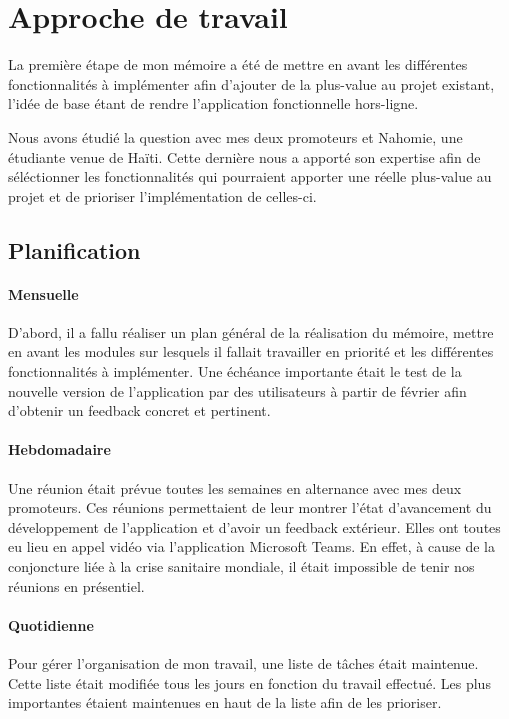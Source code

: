 \documentclass{EPL-master-thesis-covers-FR}
\begin{document}
		\section{Approche de travail}
			La première étape de  mon mémoire a été de mettre en avant les différentes fonctionnalités à implémenter afin d'ajouter de la plus-value au projet existant, l'idée de base étant de rendre l'application fonctionnelle hors-ligne.	
			
			Nous avons étudié la question avec mes deux promoteurs et Nahomie, une étudiante venue de Haïti. Cette dernière nous a apporté son expertise afin de séléctionner les fonctionnalités qui pourraient apporter une réelle plus-value au projet et de prioriser l'implémentation de celles-ci.
		

			\subsection*{Planification}
				\label{sec:planification}
				
				\paragraph*{Mensuelle}
				D'abord, il a fallu réaliser un plan général de la réalisation du mémoire, mettre en avant les modules sur lesquels il fallait travailler en priorité et les différentes fonctionnalités à implémenter. Une échéance importante était le test de la nouvelle version de l'application par des utilisateurs à partir de février afin d'obtenir un feedback concret et pertinent.
								
				\paragraph*{Hebdomadaire} 
				Une réunion était prévue toutes les semaines en alternance avec mes deux promoteurs. Ces réunions permettaient de leur montrer l'état d'avancement du développement de l'application et d'avoir un feedback extérieur. Elles ont toutes eu lieu en appel vidéo via l'application Microsoft Teams. En effet, à cause de la conjoncture liée à la crise sanitaire mondiale, il était impossible de tenir nos réunions en présentiel.
				
				\paragraph*{Quotidienne}
				Pour gérer l'organisation de mon travail, une liste de tâches était maintenue. Cette liste était modifiée tous les jours en fonction du travail effectué. Les plus importantes étaient maintenues en haut de la liste afin de les prioriser. 
				
\end{document}
